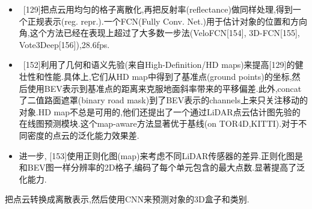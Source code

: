 \documentclass{article}
\begin{document}
\begin{itemize}
    \item \ [129]把点云用均匀的格子离散化,再把反射率(reflectance)做同样处理,得到一个正规表示(reg. repr.).一个FCN(Fully Conv. Net.)用于估计对象的位置和方向角,这个方法已经在表现上超过了大多数一步法(VeloFCN[154], 3D-FCN[155], Vote3Deep[156]),28.6fps.
    \item \ [152]利用了几何和语义先验(来自High-Definition/HD maps)来提高[129]的健壮性和性能.具体上,它们从HD map中得到了基准点(ground points)的坐标,然后使用BEV表示到基准点的距离来克服地面斜率带来的平移偏差.此外,concat了二值路面遮罩(binary road mask)到了BEV表示的channels上来只关注移动的对象.HD map不总是可用的,他们还提出了一个通过LiDAR点云估计图先验的在线图预测模块.这个map-aware方法显著优于基线(on TOR4D,KITTI).对于不同密度的点云的泛化能力效果差.
    \item 进一步, [153]使用正则化图(map)来考虑不同LiDAR传感器的差异.正则化图是和BEV图一样分辨率的2D格子,编码了每个单元包含的最大点数.显著提高了泛化能力.
\end{itemize}

 把点云转换成离散表示,然后使用CNN来预测对象的3D盒子和类别.
\end{document}

